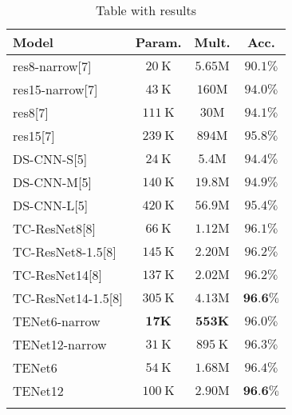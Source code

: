 \begin{table}
	\caption{Table with results}
\begin{tabular}{lccc}
	
	\hline 
	Model & Param. & Mult. & Acc. \\
	\hline \hline
	
	res8-narrow[7] & $20 \mathrm{~K}$ & $5.65 \mathrm{M}$ & $90.1 \%$ \\
	res15-narrow[7] & $43 \mathrm{~K}$ & $160 \mathrm{M}$ & $94.0 \%$ \\
	res8[7] & $111 \mathrm{~K}$ & $30 \mathrm{M}$ & $94.1 \%$ \\
	res15[7] & $239 \mathrm{~K}$ & $894 \mathrm{M}$ & $95.8 \%$ \\
	\hline 
	DS-CNN-S[5] & $24 \mathrm{~K}$ & $5.4 \mathrm{M}$ & $94.4 \%$ \\
	DS-CNN-M[5] & $140 \mathrm{~K}$ & $19.8 \mathrm{M}$ & $94.9 \%$ \\
	DS-CNN-L[5] & $420 \mathrm{~K}$ & $56.9 \mathrm{M}$ & $95.4 \%$ \\
	\hline TC-ResNet8[8] & $66 \mathrm{~K}$ & $1.12 \mathrm{M}$ & $96.1 \%$ \\
	TC-ResNet8-1.5[8] & $145 \mathrm{~K}$ & $2.20 \mathrm{M}$ & $96.2 \%$ \\
	TC-ResNet14[8] & $137 \mathrm{~K}$ & $2.02 \mathrm{M}$ & $96.2 \%$ \\
	TC-ResNet14-1.5[8] & $305 \mathrm{~K}$ & $4.13 \mathrm{M}$ & $\mathbf{9 6 . 6 \%}$ \\
	\hline TENet6-narrow & $\mathbf{1 7 K}$ & $\mathbf{5 5 3 K}$ & $96.0 \%$ \\
	TENet12-narrow & $31 \mathrm{~K}$ & $895 \mathrm{~K}$ & $96.3 \%$ \\
	TENet6 & $54 \mathrm{~K}$ & $1.68 \mathrm{M}$ & $96.4 \%$ \\
	TENet12 & $100 \mathrm{~K}$ & $2.90 \mathrm{M}$ & $\mathbf{9 6 . 6 \%}$ \\
	\hline
	
	\label{table:results}
\end{tabular}
\end{table}